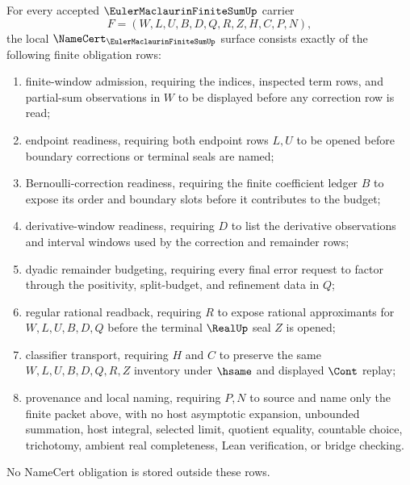 \begin{theorem}
\label{thm:euler-maclaurin-finite-sum-namecert-obligations}
For every accepted $\EulerMaclaurinFiniteSumUp$ carrier
$$
F=(W,L,U,B,D,Q,R,Z,H,C,P,N),
$$
the local $\NameCert_{\EulerMaclaurinFiniteSumUp}$ surface consists exactly of the following finite obligation rows:
\begin{enumerate}
\item finite-window admission, requiring the indices, inspected term rows, and partial-sum observations in $W$ to be displayed before any correction row is read;
\item endpoint readiness, requiring both endpoint rows $L,U$ to be opened before boundary corrections or terminal seals are named;
\item Bernoulli-correction readiness, requiring the finite coefficient ledger $B$ to expose its order and boundary slots before it contributes to the budget;
\item derivative-window readiness, requiring $D$ to list the derivative observations and interval windows used by the correction and remainder rows;
\item dyadic remainder budgeting, requiring every final error request to factor through the positivity, split-budget, and refinement data in $Q$;
\item regular rational readback, requiring $R$ to expose rational approximants for $W,L,U,B,D,Q$ before the terminal $\RealUp$ seal $Z$ is opened;
\item classifier transport, requiring $H$ and $C$ to preserve the same $W,L,U,B,D,Q,R,Z$ inventory under $\hsame$ and displayed $\Cont$ replay;
\item provenance and local naming, requiring $P,N$ to source and name only the finite packet above, with no host asymptotic expansion, unbounded summation, host integral, selected limit, quotient equality, countable choice, trichotomy, ambient real completeness, Lean verification, or bridge checking.
\end{enumerate}
No NameCert obligation is stored outside these rows.
\end{theorem}
